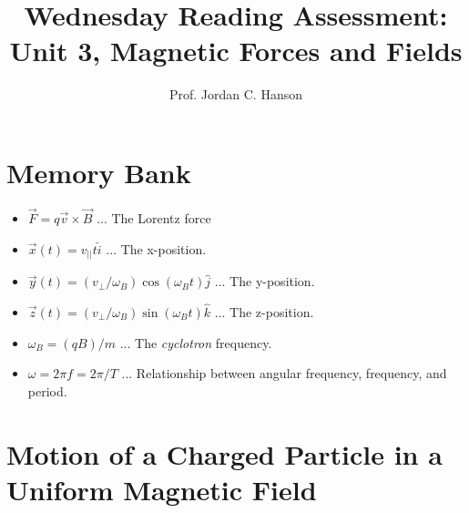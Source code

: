 \documentclass{article}
\begin{document}
\title{Wednesday Reading Assessment: Unit 3, Magnetic Forces and Fields}
\author{Prof. Jordan C. Hanson}

\maketitle

\section{Memory Bank}

\begin{itemize}
\item $\vec{F} = q\vec{v} \times \vec{B}$ ... The Lorentz force
\item $\vec{x}(t) = v_{||}t \hat{i}$ ... The x-position.
\item $\vec{y}(t) = (v_{\perp}/\omega_B) \cos(\omega_B t)\hat{j}$ ... The y-position.
\item $\vec{z}(t) = (v_{\perp}/\omega_B) \sin(\omega_B t)\hat{k}$ ... The z-position.
\item $\omega_B = (q B)/m$ ... The \textit{cyclotron} frequency.
\item $\omega = 2 \pi f = 2\pi /T$ ... Relationship between angular frequency, frequency, and period.
\end{itemize}

\section{Motion of a Charged Particle in a Uniform Magnetic Field}
\end{document}
